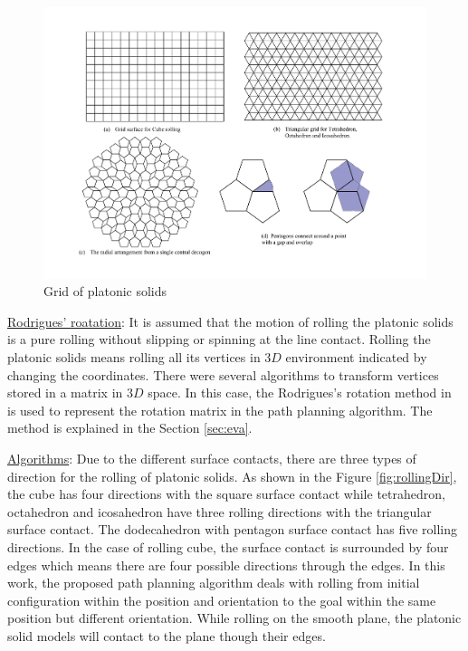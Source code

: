 %
\begin{figure}[h]
\centering
	\includegraphics[width=1\textwidth]{image/gridPlatonic.pdf}
	\caption{Grid of platonic solids}
	\label{fig:gridPlatonic}
\end{figure}


\noindent\uline{Rodrigues' roatation}: It is assumed that the motion of rolling the platonic solids is a pure rolling without slipping or spinning at the line contact.
Rolling the platonic solids means rolling all its vertices in $3D$ environment indicated by changing the coordinates. There were several algorithms to transform vertices stored in a matrix in $3D$ space. In this case, the Rodrigues's rotation method in \cite{Dai_Rodrigues_2015} is used to represent the rotation matrix in the path planning algorithm. The method is explained in the Section \ref{sec:eva}. 

%
\clearpage
\newpage
\noindent\uline{Algorithms}:
Due to the different surface contacts, there are three types of direction for the rolling of platonic solids. As shown in the Figure \ref{fig:rollingDir}, the cube has four directions with the square surface contact while tetrahedron, octahedron and icosahedron have three rolling directions with the triangular surface contact. The dodecahedron with pentagon surface contact has five rolling directions. In the case of rolling cube, the surface contact is surrounded by four edges which means there are four possible directions through the edges. In this work, the proposed path planning algorithm deals with rolling from initial configuration within the position and orientation to the goal within the same position but different orientation. While rolling on the smooth plane, the platonic solid models will contact to the plane though their edges.\\

